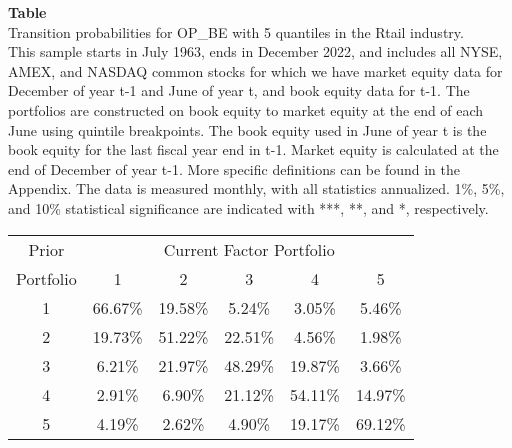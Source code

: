 \begin{table*}[ht!]
\raggedright
{}
\label{tab: transition_probs_OP_BE_Rtail_with_5_quantiles}
\textbf{Table \thetable} \\
Transition probabilities for OP_BE with 5 quantiles in the Rtail industry. \\
\hspace*{1em}This sample starts in July 1963, ends in December 2022, and includes all NYSE, AMEX, and NASDAQ common stocks for which we have market equity data for December of year t-1 and June of year t, and book equity data for t-1. The portfolios are constructed on book equity to market equity at the end of each June using quintile breakpoints.  The book equity used in June of year t is the book equity for the last fiscal year end in t-1.  Market equity is calculated at the end of December of year t-1.  More specific definitions can be found in the Appendix.  The data is measured monthly, with all statistics annualized.  1\%, 5\%, and 10\% statistical significance are indicated with ***, **, and *, respectively. \\
\vspace{0.5em}
\centering
\begin{adjustbox}{max width=\textwidth}
\begin{tabular}{@{}cccccc@{}}
\toprule
Prior & \multicolumn{5}{c}{Current Factor Portfolio} \\
Portfolio & 1 & 2 & 3 & 4 & 5 \\
\midrule
1 & 66.67\% & 19.58\% & 5.24\% & 3.05\% & 5.46\% \\
2 & 19.73\% & 51.22\% & 22.51\% & 4.56\% & 1.98\% \\
3 & 6.21\% & 21.97\% & 48.29\% & 19.87\% & 3.66\% \\
4 & 2.91\% & 6.90\% & 21.12\% & 54.11\% & 14.97\% \\
5 & 4.19\% & 2.62\% & 4.90\% & 19.17\% & 69.12\% \\
\bottomrule
\end{tabular}
\end{adjustbox}
\end{table*}